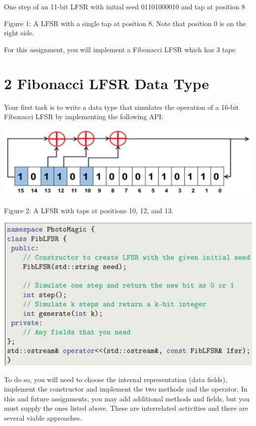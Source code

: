 \documentclass[10pt]{article}
\begin{document}
One step of an 11-bit LFSR with initial seed 01101000010 and tap at position 8

Figure 1: A LFSR with a single tap at position 8. Note that position 0 is on the right side.

For this assignment, you will implement a Fibonacci LFSR which has 3 taps:

\section*{2 Fibonacci LFSR Data Type}
Your first task is to write a data type that simulates the operation of a 16-bit Fibonacci LFSR by implementing the following API:

\begin{center}
\includegraphics[max width=\textwidth]{2024_03_21_ddd7c97e7fb9b272aea0g-2}
\end{center}

Figure 2: A LFSR with taps at positions 10, 12, and 13.

\begin{center}
\includegraphics[max width=\textwidth]{2024_03_21_ddd7c97e7fb9b272aea0g-2(1)}
\end{center}

To do so, you will need to choose the internal representation (data fields), implement the constructor and implement the two methods and the operator. In this and future assignments, you may add additional methods and fields, but you must supply the ones listed above. These are interrelated activities and there are several viable approaches.
\end{document}
